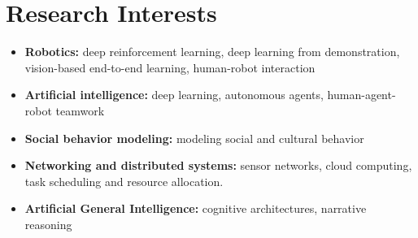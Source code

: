 
\section{Research Interests}

\begin{itemize}[nosep, noitemsep]
    \item {\bf Robotics:} deep reinforcement learning, deep learning from demonstration, vision-based end-to-end learning, human-robot interaction
    \item {\bf Artificial intelligence:} deep learning, autonomous agents, human-agent-robot teamwork
    \item {\bf Social behavior modeling:} modeling social and cultural behavior
    \item {\bf Networking and distributed systems:} sensor networks, cloud computing, task scheduling and resource allocation.
    \item {\bf Artificial General Intelligence:} cognitive architectures, narrative reasoning
\end{itemize}

